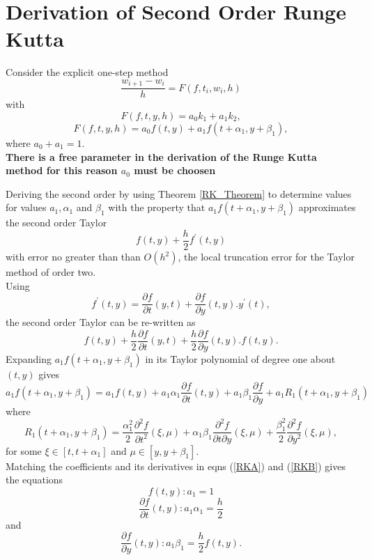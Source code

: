 \section{Derivation of Second Order Runge Kutta}
Consider the explicit one-step method\\
\begin{equation}
\frac{w_{i+1}-w_i}{h}=F(f,t_i,w_i,h)
\end{equation}
with
\begin{equation}
F(f,t,y,h)=a_0k_1+a_1k_2,
\end{equation}
\begin{equation}
F(f,t,y,h)=a_0f(t,y)+a_1f(t+\alpha_1,y+\beta_1),
\end{equation}
where $a_0+a_1=1.$\\
\textbf{There is a free parameter in the derivation of the Runge Kutta method for this reason $a_0$ must be choosen}

Deriving the second order  by using Theorem \ref{RK_Theorem} to determine values for values  $a_1,\alpha_1$ and $\beta_1$ with the property that $a_1f(t+\alpha_1,y+\beta_1)$ approximates the second order Taylor
\[f(t,y)+\frac{h}{2}f^{'}(t,y) \]
with error no greater than than $O(h^2)$, the local truncation error for
the Taylor method of order two.\\
Using
\[f^{'}(t,y)=\frac{\partial f}{\partial t}(y,t)+\frac{\partial f}{\partial y}(t,y).y^{'}(t), \]
the second order Taylor can be re-written as
\begin{equation}
\label{RKA}
f(t,y)+\frac{h}{2}\frac{\partial f}{\partial t}(y,t)+\frac{h}{2}\frac{\partial f}{\partial y}(t,y).f(t,y).
\end{equation}
Expanding $a_1f(t+\alpha_1,y+\beta_1)$ in its Taylor polynomial of degree one about
$(t,y)$ gives
\begin{equation}
\label{RKB}
a_1f(t+\alpha_1,y+\beta_1)= a_1 f(t,y) +a_1 \alpha_1 \frac{\partial f}{\partial t}(t,y)+a_1 \beta_1\frac{\partial f}{\partial y}+a_1R_1(t+\alpha_1,y+\beta_1)
\end{equation}
where
\[ R_1(t+\alpha_1,y+\beta_1)=\frac{\alpha_1^2}{2}\frac{\partial^2 f}{\partial t ^2}(\xi,\mu)
+\alpha_1 \beta_1 \frac{\partial^2 f}{\partial t \partial y}(\xi,\mu)
+\frac{\beta_1^2}{2}\frac{\partial^2 f}{\partial y^2} (\xi,\mu),
\]for some $\xi \in [t,t+\alpha_1]$ and $\mu \in [y,y+\beta_1]$.\\
Matching the coefficients and its derivatives in eqns (\ref{RKA}) and (\ref{RKB}) 
gives the equations
\[f(t,y): a_1=1\]
\[\frac{\partial f }{\partial t}(t,y): a_1\alpha_1=\frac{h}{2} \]
and
\[\frac{\partial f }{\partial y}(t,y): a_1\beta_1=\frac{h}{2}f(t,y). \]
